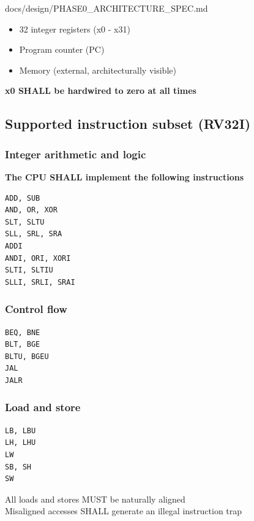 \begin{relocated}{docs/design/PHASE0_ARCHITECTURE_SPEC.md}
\begin{itemize}
\tightlist
\item
  32 integer registers (x0 - x31)
\item
  Program counter (PC)
\item
  Memory (external, architecturally visible)
\end{itemize}

\textbf{x0 SHALL be hardwired to zero at all times}

\subsection{Supported instruction subset (RV32I)}\label{ds:ch:phase0-architecture:supported-instruction-subset-rv32i}

\subsubsection{Integer arithmetic and logic}\label{ds:ch:phase0-architecture:integer-arithmetic-and-logic}

\textbf{The CPU SHALL implement the following instructions}

\begin{lstlisting}[language={}]
ADD, SUB
AND, OR, XOR
SLT, SLTU
SLL, SRL, SRA
ADDI
ANDI, ORI, XORI
SLTI, SLTIU
SLLI, SRLI, SRAI
\end{lstlisting}

\subsubsection{Control flow}\label{ds:ch:phase0-architecture:control-flow}

\begin{lstlisting}[language={}]
BEQ, BNE
BLT, BGE
BLTU, BGEU
JAL
JALR
\end{lstlisting}

\subsubsection{Load and store}\label{ds:ch:phase0-architecture:load-and-store}

\begin{lstlisting}[language={}]
LB, LBU
LH, LHU
LW
SB, SH
SW
\end{lstlisting}

All loads and stores MUST be naturally aligned \\
Misaligned accesses SHALL generate an illegal instruction trap


\end{relocated}

